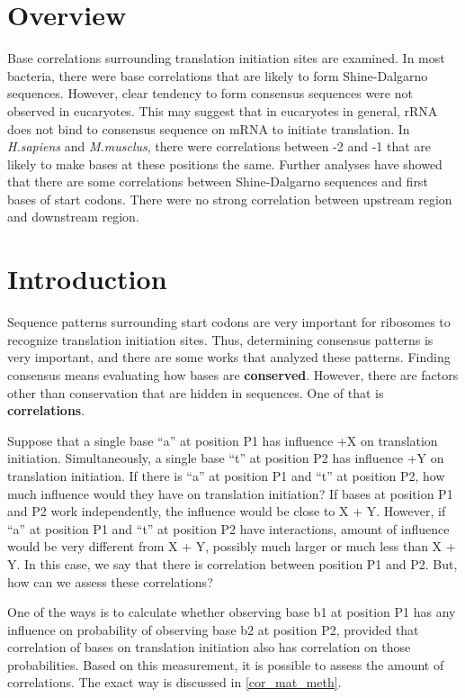 
\section{Overview}

Base correlations surrounding translation initiation sites are examined. 
In most bacteria, there were base correlations that are likely to form
Shine-Dalgarno sequences. However, clear tendency to form consensus
sequences were not observed in eucaryotes. This may suggest that in
eucaryotes in general, rRNA does not bind to consensus sequence on mRNA
to initiate translation. In {\it H.sapiens} and {\it M.musclus}, there
were correlations between -2 and -1 that are likely to make bases at
these positions the same. Further analyses have showed that there are
some correlations between Shine-Dalgarno sequences and first bases of
start codons. There were no strong correlation between upstream region
and downstream region.


\section{Introduction}

Sequence patterns surrounding start codons are very
important for ribosomes to recognize translation initiation
sites. Thus, determining consensus patterns is very important, and
there are some works that analyzed these patterns. Finding consensus
means evaluating how bases are {\bf conserved}. However, there are
factors other than conservation that are hidden in sequences. One of
that is {\bf correlations}. 

Suppose that a single base ``a'' at position P1 has influence +X on
translation initiation. Simultaneously, a single base ``t'' at
position P2 has influence +Y on translation initiation. If there is
``a'' at position P1 and ``t'' at position P2, how much influence
would they have on translation initiation? If bases at position P1 and
P2 work independently, the influence would be close to X +
Y. However, if ``a'' at position P1 and ``t'' at position P2 have
interactions, amount of influence would be very different from X + Y,
possibly much larger or much less than X + Y. In this case, we say
that there is correlation between position P1 and P2. But, how can we
assess these correlations?

One of the ways is to calculate whether observing base b1 at position
P1 has any influence on probability of observing base b2 at position
P2, provided that correlation of bases on translation initiation also
has correlation on those probabilities. Based on this measurement, it
is possible to assess the amount of correlations. The exact way is
discussed in \ref{cor_mat_meth}.

